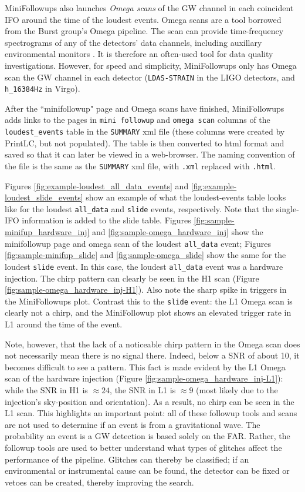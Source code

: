 MiniFollowups also launches \emph{Omega scans} of the \ac{GW} channel in each coincident \ac{IFO} around the time of the loudest events. Omega scans are a tool borrowed from the Burst group's Omega pipeline. The scan can provide time-frequency spectrograms of any of the detectors' data channels, including auxillary environmental monitors \cite{wiki.ligo.org/foswiki/bin/view/DetChar/OmegaScan}. It is therefore an often-used tool for data quality investigations. However, for speed and simplicity, MiniFollowups only has Omega scan the \ac{GW} channel in each detector (\verb|LDAS-STRAIN| in the \ac{LIGO} detectors, and \verb|h_16384Hz| in Virgo).

After the ``minifollowup" page and Omega scans have finished, MiniFollowups adds links to the pages in \verb|mini followup| and \verb|omega scan| columns of the \verb|loudest_events| table in the \verb|SUMMARY| xml file (these columns were created by PrintLC, but not populated). The table is then converted to html format and saved so that it can later be viewed in a web-browser. The naming convention of the file is the same as the \verb|SUMMARY| xml file, with \verb|.xml| replaced with \verb|.html|.

Figures \ref{fig:example-loudest_all_data_events} and \ref{fig:example-loudest_slide_events} show an example of what the loudest-events table looks like for the loudest \verb|all_data| and \verb|slide| events, respectively. Note that the single-\ac{IFO} information is added to the slide table. Figures \ref{fig:sample-minifup_hardware_inj} and \ref{fig:sample-omega_hardware_inj} show the minifollowup page and omega scan of the loudest \verb|all_data| event; Figures \ref{fig:sample-minifup_slide} and \ref{fig:sample-omega_slide} show the same for the loudest \verb|slide| event. In this case, the loudest \verb|all_data| event was a hardware injection. The chirp pattern can clearly be seen in the H1 scan (Figure \ref{fig:sample-omega_hardware_inj-H1}). Also note the sharp spike in triggers in the MiniFollowups plot. Contrast this to the \verb|slide| event: the L1 Omega scan is clearly not a chirp, and the MiniFollowup plot shows an elevated trigger rate in L1 around the time of the event.

Note, however, that the lack of a noticeable chirp pattern in the Omega scan does not necessarily mean there is no signal there. Indeed, below a \ac{SNR} of about 10, it becomes difficult to see a pattern. This fact is made evident by the L1 Omega scan of the hardware injection (Figure \ref{fig:sample-omega_hardware_inj-L1}): while the \ac{SNR} in H1 is $\approx 24$, the \ac{SNR} in L1 is $\approx 9$ (most likely due to the injection's sky-position and orientation). As a result, no chirp can be seen in the L1 scan. This highlights an important point: all of these followup tools and scans are not used to determine if an event is from a gravitational wave. The probability an event is a \ac{GW} detection is based solely on the \ac{FAR}. Rather, the followup tools are used to better understand what types of glitches affect the performance of the pipeline. Glitches can thereby be classified; if an environmental or instrumental cause can be found, the detector can be fixed or vetoes can be created, thereby improving the search. 

